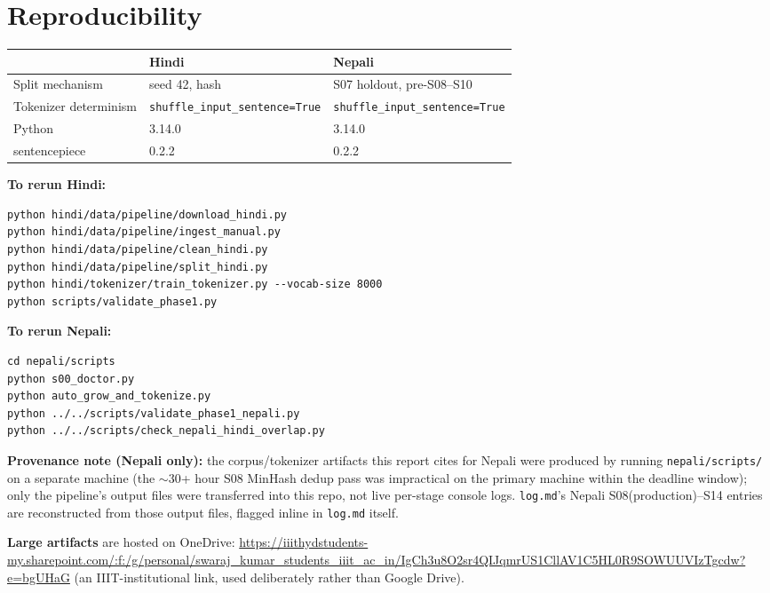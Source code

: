 \documentclass[11pt]{article}
\begin{document}
\section{Reproducibility}

\begin{table}[htbp]
\centering
\begin{tabular}{lll}
\toprule
& Hindi & Nepali \\
\midrule
Split mechanism & seed 42, hash & S07 holdout, pre-S08--S10 \\
Tokenizer determinism & \texttt{shuffle\_input\_sentence=True} & \texttt{shuffle\_input\_sentence=True} \\
Python & 3.14.0 & 3.14.0 \\
sentencepiece & 0.2.2 & 0.2.2 \\
\bottomrule
\end{tabular}
\end{table}

\textbf{To rerun Hindi:}
\begin{verbatim}
python hindi/data/pipeline/download_hindi.py
python hindi/data/pipeline/ingest_manual.py
python hindi/data/pipeline/clean_hindi.py
python hindi/data/pipeline/split_hindi.py
python hindi/tokenizer/train_tokenizer.py --vocab-size 8000
python scripts/validate_phase1.py
\end{verbatim}

\textbf{To rerun Nepali:}
\begin{verbatim}
cd nepali/scripts
python s00_doctor.py
python auto_grow_and_tokenize.py
python ../../scripts/validate_phase1_nepali.py
python ../../scripts/check_nepali_hindi_overlap.py
\end{verbatim}

\textbf{Provenance note (Nepali only):} the corpus/tokenizer artifacts
this report cites for Nepali were produced by running
\texttt{nepali/scripts/} on a separate machine (the $\sim$30+ hour S08
MinHash dedup pass was impractical on the primary machine within the
deadline window); only the pipeline's output files were transferred into
this repo, not live per-stage console logs. \texttt{log.md}'s Nepali
S08(production)--S14 entries are reconstructed from those output files,
flagged inline in \texttt{log.md} itself.

\textbf{Large artifacts} are hosted on OneDrive:
\url{https://iiithydstudents-my.sharepoint.com/:f:/g/personal/swaraj_kumar_students_iiit_ac_in/IgCh3u8O2sr4QIJqmrUS1CllAV1C5HL0R9SOWUUVIzTgcdw?e=bgUHaG}
(an IIIT-institutional link, used deliberately rather than Google Drive).
\end{document}

